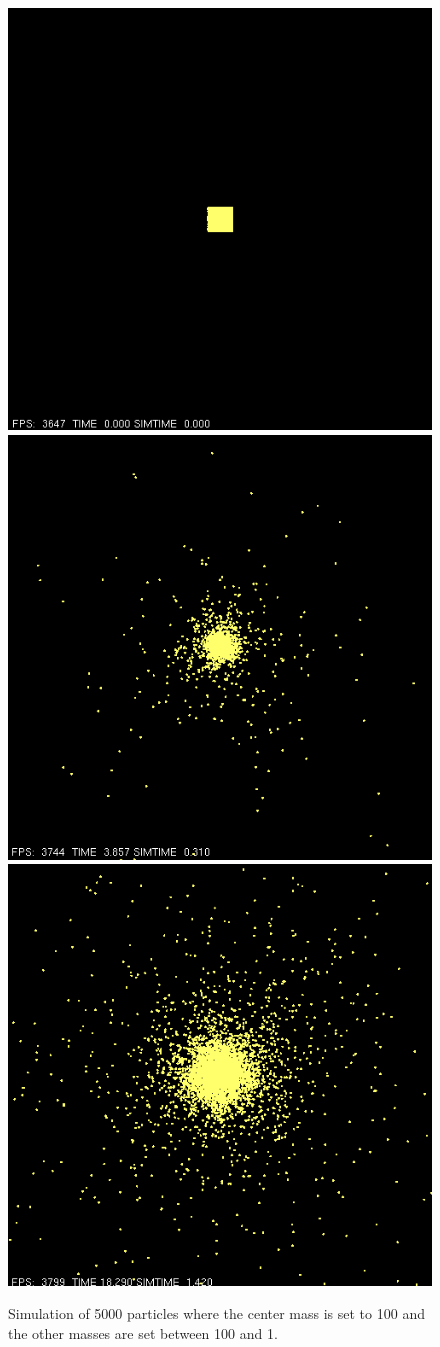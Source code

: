 \documentclass{egpubl}
\begin{document}
\begin{figure}[H]
  \centering
  \includegraphics[width=.5\linewidth]{Screen_Caps/5000ptk_100_and_X_1.png}
  \includegraphics[width=.5\linewidth]{Screen_Caps/5000ptk_100_and_X_2.png}
  \includegraphics[width=.5\linewidth]{Screen_Caps/5000ptk_100_and_X_3.png}
  \caption{\label{fig:Fig4}
           Simulation of 5000 particles where the center mass is set to 100 and the other masses are set between 100 and 1.}
\end{figure}
\end{document}
